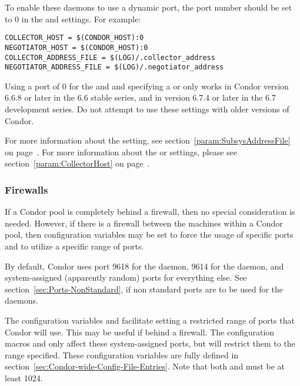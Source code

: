 To enable these daemons to use a dynamic port, the port number should
be set to 0 in the  and
 settings.
For example:
\begin{verbatim}
COLLECTOR_HOST = $(CONDOR_HOST):0
NEGOTIATOR_HOST = $(CONDOR_HOST):0
COLLECTOR_ADDRESS_FILE = $(LOG)/.collector_address
NEGOTIATOR_ADDRESS_FILE = $(LOG)/.negotiator_address
\end{verbatim}

\Note Using a port of 0 for the  and
 and specifying a
 or
only works in Condor version 6.6.8 or later in the 6.6 stable series,
and in version 6.7.4 or later in the 6.7 development series.
Do not attempt to use these settings with older versions of Condor.

For more information about the 
setting, see section~\ref{param:SubsysAddressFile} on
page~\pageref{param:SubsysAddressFile}.
For more information about the  or
 settings, please see
section~\ref{param:CollectorHost} on
page~\pageref{param:CollectorHost}.



\subsubsection{\label{sec:Ports-Firewalls}Firewalls}

If a Condor pool is completely behind a firewall,
then no special consideration is needed.
However, if there is a firewall between the machines within
a Condor pool, then
configuration variables may be set to force the usage of
specific ports and to utilize a specific range of ports.

By default,
Condor uses port 9618 for the  daemon,
9614 for the  daemon,
and system-assigned (apparently random) ports for everything else.
See section~\ref{sec:Ports-NonStandard},
if non standard ports are to be used for the
  daemons.

The configuration variables
 and  facilitate setting a restricted
range of ports that Condor will use.
This may be useful if behind a firewall.
The configuration macros
 and  only affect these
system-assigned ports, but will restrict them to the range specified.
These configuration variables are fully defined
in section~\ref{sec:Condor-wide-Config-File-Entries}.
Note that both  and  must be at least 1024.

